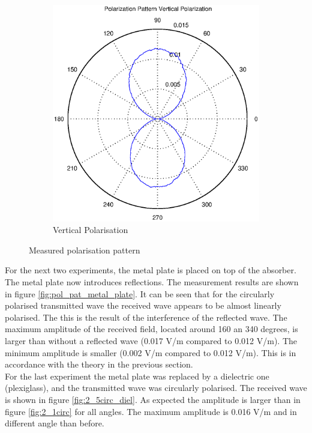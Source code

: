 \documentclass[11pt,a4paper]{article}
\begin{document}
\begin{figure}[H]
\begin{subfigure}{0.5\textwidth}
  \includegraphics[width=1.2\linewidth]{2_2vert_pol.eps}
  \caption{Vertical Polarisation}
  \label{fig:2_1vert}
\end{subfigure}
\caption{Measured polarisation pattern}
\label{fig:pol_pat}
\end{figure}

For the next two experiments, the metal plate is placed on top of the absorber. The metal plate now introduces reflections. The measurement results are shown in figure \ref{fig:pol_pat_metal_plate}. It can be seen that for the circularly polarised transmitted wave the received wave appears to be almost linearly polarised. The this is the result of the interference of the reflected wave. The maximum amplitude of the received field, located around 160 an 340 degrees, is larger than without a reflected wave (0.017 V/m compared to 0.012 V/m). The minimum amplitude is smaller (0.002 V/m compared to 0.012 V/m). This is in accordance with the theory in the previous section.\\
For the last experiment the metal plate was replaced by a dielectric one (plexiglass), and the transmitted wave was circularly polarised. The received wave is shown in figure \ref{fig:2_5circ_diel}. As expected the amplitude is larger than in figure \ref{fig:2_1circ} for all angles. The maximum amplitude is 0.016 V/m and in different angle than before. 
\end{document}

